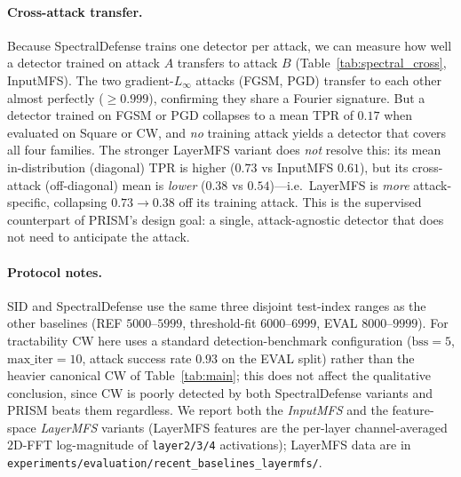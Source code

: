 \paragraph{Cross-attack transfer.}
Because SpectralDefense trains one detector per attack, we can measure how
well a detector trained on attack $A$ transfers to attack $B$
(Table~\ref{tab:spectral_cross}, InputMFS). The two gradient-$L_\infty$ attacks
(FGSM, PGD) transfer to each other almost perfectly ($\ge 0.999$), confirming
they share a Fourier signature. But a detector trained on FGSM or PGD
collapses to a mean TPR of $0.17$ when evaluated on Square or CW, and
\emph{no} training attack yields a detector that covers all four families.
The stronger LayerMFS variant does \emph{not} resolve this: its mean
in-distribution (diagonal) TPR is higher ($0.73$ vs InputMFS $0.61$), but its
cross-attack (off-diagonal) mean is \emph{lower} ($0.38$ vs $0.54$)---i.e.\
LayerMFS is \emph{more} attack-specific, collapsing $0.73{\to}0.38$ off its
training attack. This is the supervised counterpart of PRISM's design goal: a
single, attack-agnostic detector that does not need to anticipate the attack.

\begin{table}[H]
\centering
\small

\caption{SpectralDefense (InputMFS) cross-attack transfer, 5-seed mean L1
TPR. Underlined entries are in-distribution (train attack $=$ eval attack).
Gradient-$L_\infty$ detectors (FGSM/PGD rows) transfer to each other
($\ge 0.999$) but collapse on Square/CW ($\le 0.22$); no row covers all four
columns. Source:
\texttt{experiments/evaluation/recent\_baselines/} (per-seed JSONs,
\texttt{analyze\_cross\_attack.py}).}
\label{tab:spectral_cross}
\end{table}

\paragraph{Protocol notes.}
SID and SpectralDefense use the same three disjoint test-index ranges as the
other baselines (REF $5000$--$5999$, threshold-fit $6000$--$6999$, EVAL
$8000$--$9999$). For tractability CW here uses a standard detection-benchmark
configuration ($\text{bss}{=}5$, $\text{max\_iter}{=}10$, attack success rate
$0.93$ on the EVAL split) rather than the heavier canonical CW of
Table~\ref{tab:main}; this does not affect the qualitative conclusion, since
CW is poorly detected by both SpectralDefense variants and PRISM beats them
regardless. We report both the \emph{InputMFS} and the feature-space
\emph{LayerMFS} variants (LayerMFS features are the per-layer channel-averaged
$2$D-FFT log-magnitude of \texttt{layer2/3/4} activations); LayerMFS data are
in \texttt{experiments/evaluation/recent\_baselines\_layermfs/}.

